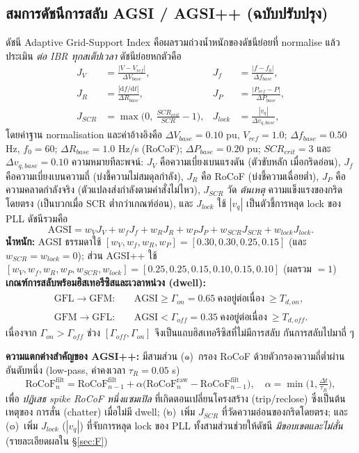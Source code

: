 \documentclass[12pt,a4paper]{article}
\begin{document}
\subsection{สมการดัชนีการสลับ AGSI / AGSI++ (ฉบับปรับปรุง)}
ดัชนี Adaptive Grid-Support Index คือผลรวมถ่วงน้ำหนักของดัชนีย่อยที่ normalise แล้ว ประเมิน \emph{ต่อ IBR
ทุกสเต็ปเวลา} ดัชนีย่อยหกตัวคือ
\begin{align}
J_V &= \frac{|V-V_{ref}|}{\Delta V_{base}}, &
J_f &= \frac{|f-f_0|}{\Delta f_{base}},\\
J_R &= \frac{|\mathrm{d}f/\mathrm{d}t|}{\Delta R_{base}}, &
J_P &= \frac{|P_{ref}-P|}{\Delta P_{base}},\\
J_{SCR} &= \max\!\Big(0,\ \tfrac{SCR_{crit}}{SCR}-1\Big), &
J_{lock} &= \frac{|v_q|}{\Delta v_{q,base}},
\end{align}
โดยค่าฐาน normalisation และค่าอ้างอิงคือ $\Delta V_{base}=0.10$ pu, $V_{ref}=1.0$;
$\Delta f_{base}=0.50$ Hz, $f_0=60$; $\Delta R_{base}=1.0$ Hz/s (RoCoF); $\Delta P_{base}=0.20$ pu;
$SCR_{crit}=3$ และ $\Delta v_{q,base}=0.10$ ความหมายทีละพจน์: $J_V$ คือความเบี่ยงเบนแรงดัน (ตัวขับหลัก
เมื่อกริดอ่อน), $J_f$ คือความเบี่ยงเบนความถี่ (บ่งชี้ความไม่สมดุลกำลัง), $J_R$ คือ RoCoF (บ่งชี้ความเฉื่อยต่ำ),
$J_P$ คือความคลาดกำลังจริง (ตัวแปลงส่งกำลังตามคำสั่งไม่ไหว), $J_{SCR}$ วัด \emph{ต้นเหตุ} ความแข็งแรงของกริด
โดยตรง (เป็นบวกเมื่อ SCR ต่ำกว่าเกณฑ์อ่อน), และ $J_{lock}$ ใช้ $|v_q|$ เป็นตัวชี้การหลุด lock ของ PLL
ดัชนีรวมคือ
\begin{equation}
\mathrm{AGSI}=w_V J_V + w_f J_f + w_R J_R + w_P J_P + w_{SCR}J_{SCR} + w_{lock}J_{lock}.
\label{eq:agsi2}
\end{equation}
\textbf{น้ำหนัก:} AGSI ธรรมดาใช้ $[w_V,w_f,w_R,w_P]=[0.30,0.30,0.25,0.15]$ (และ $w_{SCR}=w_{lock}=0$);
ส่วน AGSI++ ใช้ $[w_V,w_f,w_R,w_P,w_{SCR},w_{lock}]=[0.25,0.25,0.15,0.10,0.15,0.10]$ (ผลรวม $=1$)
\textbf{เกณฑ์การสลับพร้อมฮิสเทอรีซิสและเวลาหน่วง (dwell):}
\begin{align}
\text{GFL}\to\text{GFM}:&\quad \mathrm{AGSI}\ge\Gamma_{on}=0.65\ \text{คงอยู่ต่อเนื่อง}\ \ge T_{d,on},\\
\text{GFM}\to\text{GFL}:&\quad \mathrm{AGSI}<\Gamma_{off}=0.35\ \text{คงอยู่ต่อเนื่อง}\ \ge T_{d,off}.
\end{align}
เนื่องจาก $\Gamma_{on}>\Gamma_{off}$ ช่วง $[\Gamma_{off},\Gamma_{on}]$ จึงเป็นแถบฮิสเทอรีซิสที่ไม่มีการสลับ
กันการสลับไปมาถี่ ๆ

\textbf{ความแตกต่างสำคัญของ AGSI++:} มีสามส่วน (๑)~กรอง RoCoF ด้วยตัวกรองความถี่ต่ำผ่านอันดับหนึ่ง
(low-pass, ค่าคงเวลา $\tau_R=0.05$ s)
\begin{equation}
\mathrm{RoCoF}^{\text{filt}}_{n}=\mathrm{RoCoF}^{\text{filt}}_{n-1}
  +\alpha\big(\mathrm{RoCoF}^{\text{raw}}_{n}-\mathrm{RoCoF}^{\text{filt}}_{n-1}\big),
\quad \alpha=\min\!\Big(1,\tfrac{\Delta t}{\tau_R}\Big),
\label{eq:rocoffilt2}
\end{equation}
เพื่อ \emph{ปฏิเสธ spike RoCoF หนึ่งแซมเปิล} ที่เกิดตอนเปลี่ยนโครงสร้าง (trip/reclose) ซึ่งเป็นต้นเหตุของ
การสั่น (chatter) เมื่อไม่มี dwell; (๒)~เพิ่ม $J_{SCR}$ ที่วัดความอ่อนของกริดโดยตรง; และ (๓)~เพิ่ม $J_{lock}$
($|v_q|$) ที่จับการหลุด lock ของ PLL ทั้งสามส่วนช่วยให้ดัชนี \emph{มีขอบเขตและไม่สั่น} (รายละเอียดผลใน
\S\ref{sec:F})
\end{document}
